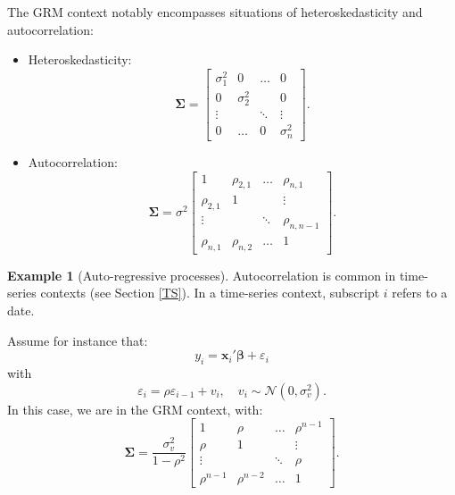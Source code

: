 \documentclass[
  12pt,
]{book}
\theoremstyle{definition}
\theoremstyle{definition}
\newtheorem{example}{Example}[chapter]
\theoremstyle{definition}
\theoremstyle{definition}
\theoremstyle{remark}
\begin{document}
The GRM context notably encompasses situations of heteroskedasticity and autocorrelation:

\begin{itemize}
\item
  Heteroskedasticity:
  \begin{equation}
  \boldsymbol\Sigma = \left[  \begin{array}{cccc}
  \sigma_1^2 & 0 & \dots & 0 \\
  0 & \sigma_2^2 &  & 0 \\
  \vdots && \ddots& \vdots \\
  0 & \dots & 0 & \sigma_n^2
  \end{array} \right]. \label{eq:heteroskedasticity}
  \end{equation}
\item
  Autocorrelation:
  \begin{equation}
  \boldsymbol\Sigma = \sigma^2 \left[ \begin{array}{cccc}
  1 & \rho_{2,1} & \dots & \rho_{n,1} \\
  \rho_{2,1} & 1 &  & \vdots \\
  \vdots && \ddots& \rho_{n,n-1} \\
  \rho_{n,1} & \rho_{n,2} & \dots & 1
  \end{array} \right]. \label{eq:autocorrelation}
  \end{equation}
\end{itemize}

\begin{example}[Auto-regressive processes]
\protect\hypertarget{exm:autocorrelaaa}{}\label{exm:autocorrelaaa}Autocorrelation is common in time-series contexts (see Section \ref{TS}). In a time-series context, subscript \(i\) refers to a date.

Assume for instance that:
\begin{equation}
y_i = \mathbf{x}_i' \boldsymbol\beta + \varepsilon_i \label{eq:usual}
\end{equation}
with
\begin{equation}
\varepsilon_i = \rho \varepsilon_{i-1} + v_i, \quad v_i \sim \mathcal{N}(0,\sigma_v^2).\label{eq:usual2}
\end{equation}
In this case, we are in the GRM context, with:
\begin{equation}
\boldsymbol\Sigma =\frac{ \sigma_v^2}{1 - \rho^2} \left[    \begin{array}{cccc}
1 & \rho & \dots & \rho^{n-1} \\
\rho & 1 &  & \vdots \\
\vdots && \ddots& \rho \\
\rho^{n-1} & \rho^{n-2} & \dots & 1
\end{array} \right].\label{eq:SigmaAutocorrel}
\end{equation}
\end{example}
\end{document}
